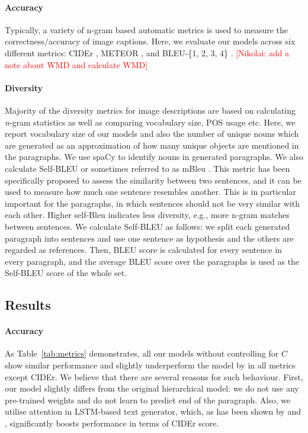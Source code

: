 \documentclass[11pt,a4paper]{article}
\newcommand{\kibitz}[2]{\ifnum\Comments=1\textcolor{#1}{#2}\fi}
\newcommand{\nikolai}[1]{\kibitz{red}      {[Nikolai: #1]}}
\begin{document}
\paragraph{Accuracy}
Typically, a variety of n-gram based automatic metrics is used to measure the correctness/accuracy of image captions.
Here, we evaluate our models across six different metrics: CIDEr \cite{vedantam2014cider}, METEOR \cite{meteor14}, and BLEU-\{1, 2, 3, 4\} \cite{bleu}.
\nikolai{add a note about WMD and calculate WMD}

\paragraph{Diversity}
Majority of the diversity metrics for image descriptions are based on calculating \textit{n}-gram statistics as well as comparing vocabulary size, POS usage etc.
Here, we report vocabulary size of our models and also the number of unique nouns which are generated as an approximation of how many unique objects are mentioned in the paragraphs. We use spaCy \cite{spacy15} to identify nouns in generated paragraphs.
We also calculate Self-BLEU \cite{Zhu2018selfbleu} or sometimes referred to as mBleu \cite{Shetty2017}.
This metric has been specifically proposed to assess the similarity between two sentences, and it can be used to measure how much one sentence resembles another. This is in particular important for the paragraphs, in which sentences should not be very similar with each other.
Higher self-Bleu indicates less diversity, e.g., more n-gram matches between sentences.
We calculate Self-BLEU as follows: we split each generated paragraph into sentences and use one sentence as hypothesis and the others are regarded as references.
Then, BLEU score is calculated for every sentence in every paragraph, and the average BLEU score over the paragraphs is used as the Self-BLEU score of the whole set.

\subsection{Results}

\paragraph{Accuracy}
As Table~\ref{tab:metrics} demonstrates, all our models without controlling for $C$ show similar performance and slightly underperform the model by  in all metrics except CIDEr.
We believe that there are several reasons for such behaviour.
First, our model slightly differs from the original hierarchical model: we do not use any pre-trained weights and do not learn to predict end of the paragraph.
Also, we utilise attention in LSTM-based text generator, which, as has been shown by  and , significantly boosts performance in terms of CIDEr score.
\end{document}
